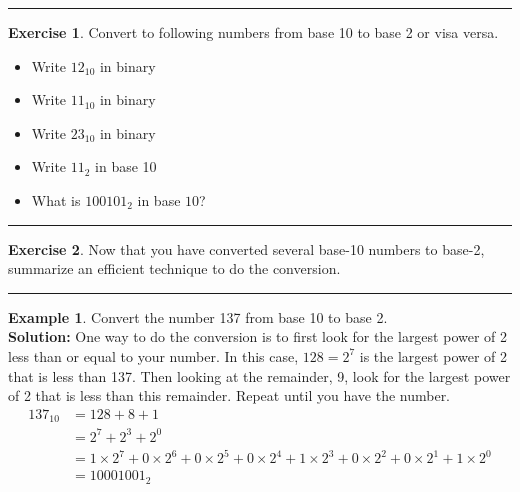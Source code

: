\documentclass[
]{book}
\providecommand{\tightlist}{%
  \setlength{\itemsep}{0pt}\setlength{\parskip}{0pt}}
\theoremstyle{definition}
\theoremstyle{definition}
\newtheorem{example}{Example}[chapter]
\theoremstyle{definition}
\newtheorem{exercise}{Exercise}[chapter]
\theoremstyle{remark}
\begin{document}
\begin{center}\rule{0.5\linewidth}{0.5pt}\end{center}

\begin{exercise}
\protect\hypertarget{exr:unnamed-chunk-11}{}{\label{exr:unnamed-chunk-11} }Convert to following numbers from base 10 to base 2 or visa versa.

\begin{itemize}
\tightlist
\item
  Write \(12_{10}\) in binary
\item
  Write \(11_{10}\) in binary
\item
  Write \(23_{10}\) in binary
\item
  Write \(11_2\) in base 10
\item
  What is \(100101_2\) in base \(10\)?
\end{itemize}
\end{exercise}

\begin{center}\rule{0.5\linewidth}{0.5pt}\end{center}

\begin{exercise}
\protect\hypertarget{exr:unnamed-chunk-12}{}{\label{exr:unnamed-chunk-12} }Now that you have converted several base-10 numbers to base-2, summarize
an efficient technique to do the conversion.
\end{exercise}

\begin{center}\rule{0.5\linewidth}{0.5pt}\end{center}

\begin{example}
\protect\hypertarget{exm:unnamed-chunk-13}{}{\label{exm:unnamed-chunk-13} }Convert the number 137 from base 10 to base 2.\\
\textbf{Solution:} One way to do the conversion is to first look for the
largest power of 2 less than or equal to your number. In this case,
\(128=2^7\) is the largest power of 2 that is less than 137. Then looking
at the remainder, 9, look for the largest power of 2 that is less than
this remainder. Repeat until you have the number. \[\begin{aligned}
        137_{10} &= 128 + 8 + 1 \\
        &= 2^7 + 2^3 + 2^0 \\
        &= 1 \times 2^7 + 0 \times 2^6 + 0 \times 2^5  + 0 \times 2^4  + 1 \times 2^3  + 0
        \times 2^2  + 0 \times 2^1  + 1 \times 2^0  \\
        &= 10001001_2
    \end{aligned}\]
\end{example}
\end{document}
